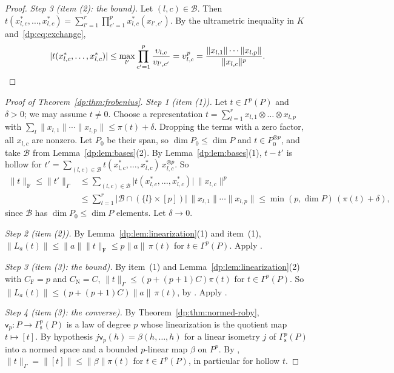 \documentclass[11pt]{amsart}
\theoremstyle{definition}
\theoremstyle{remark}
\numberwithin{equation}{section}
\newcommand{\abs}[1]{\lvert #1\rvert}
\newcommand{\norm}[1]{\lVert #1\rVert}
\theoremstyle{plain}
\theoremstyle{definition}
\theoremstyle{plain}
\begin{document}
\begin{proof}
\emph{Step 3 (item (2): the bound).} Let $(l,c)\in\mathcal B$. Then $t(x_{l,c}^*,\dots,x_{l,c}^*)=\sum_{l'=1}^r\prod_{c'=1}^px_{l,c}^*(x_{l',c'})$. By the ultrametric inequality in $K$ and~\eqref{dp:eq:exchange},
\[
 \abs{t(x_{l,c}^*,\dots,x_{l,c}^*)}\le\max_{l'}\prod_{c'=1}^p\frac{\upsilon_{l,c}}{\upsilon_{l',c'}}=\upsilon_{l,c}^p
 =\frac{\norm{x_{l,1}}\cdots\norm{x_{l,p}}}{\norm{x_{l,c}}^p}.\qedhere
\]
\end{proof}

\begin{proof}[Proof of Theorem~\ref{dp:thm:frobenius}]
\emph{Step 1 (item (1)).} Let $t\in\Gamma^p(P)$ and $\delta>0$; we may assume $t\ne0$. Choose a representation $t=\sum_{l=1}^rx_{l,1}\otimes\dots\otimes x_{l,p}$ with $\sum_l\norm{x_{l,1}}\cdots\norm{x_{l,p}}\le\pi(t)+\delta$. Dropping the terms with a zero factor, all $x_{l,c}$ are nonzero. Let $P_0$ be their span, so $\dim P_0\le\dim P$ and $t\in P_0^{\otimes p}$, and take $\mathcal B$ from Lemma~\ref{dp:lem:bases}(2). By Lemma~\ref{dp:lem:bases}(1), $t-t'$ is hollow for $t'=\sum_{(l,c)\in\mathcal B}t(x_{l,c}^*,\dots,x_{l,c}^*)\,x_{l,c}^{\otimes p}$. So
\begin{align*}
 \norm t_{\mathrm F}\le\norm{t'}_\Gamma
 &\le\sum_{(l,c)\in\mathcal B}\abs{t(x_{l,c}^*,\dots,x_{l,c}^*)}\,\norm{x_{l,c}}^p\\
 &\le\sum_{l=1}^r\abs{\mathcal B\cap(\{l\}\times[p])}\,\norm{x_{l,1}}\cdots\norm{x_{l,p}}
 \le\min(p,\dim P)\,(\pi(t)+\delta),
\end{align*}
since $\mathcal B$ has $\dim P_0\le\dim P$ elements. Let $\delta\to0$.

\emph{Step 2 (item (2)).} By Lemma~\ref{dp:lem:linearization}(1) and item~(1), $\norm{L_a(t)}\le\norm a\norm t_{\mathrm F}\le p\norm a\,\pi(t)$ for $t\in\Gamma^p(P)$. Apply \cite[Lemma~Q.1(4)]{I}.

\emph{Step 3 (item (3): the bound).} By item~(1) and Lemma~\ref{dp:lem:linearization}(2) with $C_{\mathrm F}=p$ and $C_{\mathrm N}=C$, $\norm t_\Gamma\le(p+(p+1)C)\pi(t)$ for $t\in\Gamma^p(P)$. So $\norm{L_a(t)}\le(p+(p+1)C)\norm a\,\pi(t)$, by \cite[Lemma~Q.1(1)]{I}. Apply \cite[Lemma~Q.1(4)]{I}.

\emph{Step 4 (item (3): the converse).} By Theorem~\ref{dp:thm:normed-roby}, $\mathsf v_p\colon P\to\Gamma^p_{\mathrm s}(P)$ is a law of degree $p$ whose linearization is the quotient map $t\mapsto[t]$. By hypothesis $j\mathsf v_p(h)=\beta(h,\dots,h)$ for a linear isometry $j$ of $\Gamma^p_{\mathrm s}(P)$ into a normed space and a bounded $p$\nobreakdash-linear map $\beta$ on $P^p$. By \cite[Lemma~Q.1(3)]{I}, $\norm t_\Gamma=\norm{[t]}\le\norm\beta\pi(t)$ for $t\in\Gamma^p(P)$, in particular for hollow $t$.
\end{proof}
\end{document}
